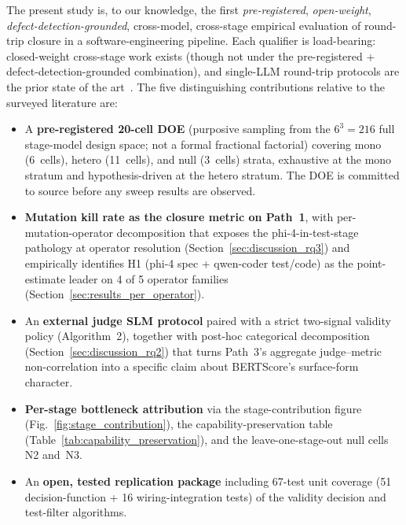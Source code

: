 The present study is, to our knowledge, the first \emph{pre-registered}, \emph{open-weight}, \emph{defect-detection-grounded}, cross-model, cross-stage empirical evaluation of round-trip closure in a software-engineering pipeline. Each qualifier is load-bearing: closed-weight cross-stage work exists (though not under the pre-registered + defect-detection-grounded combination), and single-LLM round-trip protocols are the prior state of the art~\citep{Allamanis2024RTC, Zhang2025CodingTriangle, Li2024MBCT}. The five distinguishing contributions relative to the surveyed literature are:

\begin{itemize}
  \item A \textbf{pre-registered 20-cell DOE} (purposive sampling from the $6^3 = 216$ full stage-model design space; not a formal fractional factorial) covering mono (6~cells), hetero (11~cells), and null (3~cells) strata, exhaustive at the mono stratum and hypothesis-driven at the hetero stratum. The DOE is committed to source before any sweep results are observed.
  \item \textbf{Mutation kill rate as the closure metric on Path~1}, with per-mutation-operator decomposition that exposes the phi-4-in-test-stage pathology at operator resolution (Section~\ref{sec:discussion_rq3}) and empirically identifies H1 (phi-4 spec + qwen-coder test/code) as the point-estimate leader on 4 of 5 operator families (Section~\ref{sec:results_per_operator}).
  \item An \textbf{external judge SLM protocol} paired with a strict two-signal validity policy (Algorithm~2), together with post-hoc categorical decomposition (Section~\ref{sec:discussion_rq2}) that turns Path~3's aggregate judge--metric non-correlation into a specific claim about BERTScore's surface-form character.
  \item \textbf{Per-stage bottleneck attribution} via the stage-contribution figure (Fig.~\ref{fig:stage_contribution}), the capability-preservation table (Table~\ref{tab:capability_preservation}), and the leave-one-stage-out null cells N2 and~N3.
  \item An \textbf{open, tested replication package} including 67-test unit coverage (51 decision-function + 16 wiring-integration tests) of the validity decision and test-filter algorithms.
\end{itemize}
